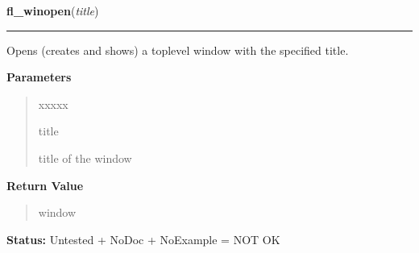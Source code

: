 \hspace{.8\funcindent}\begin{boxedminipage}{\funcwidth}

    \raggedright \textbf{fl\_winopen}(\textit{title})

    \vspace{-1.5ex}

    \rule{\textwidth}{0.5\fboxrule}
\setlength{\parskip}{2ex}
    Opens (creates and shows) a toplevel window with the specified title.

\setlength{\parskip}{1ex}
      \textbf{Parameters}
      \vspace{-1ex}

      \begin{quote}
        \begin{Ventry}{xxxxx}

          \item[title]

          title of the window

        \end{Ventry}

      \end{quote}

      \textbf{Return Value}
    \vspace{-1ex}

      \begin{quote}
      window

      \end{quote}

\textbf{Status:} Untested + NoDoc + NoExample = NOT OK



    \end{boxedminipage}

    \label{xformslib:library:fl_winhide}

    \vspace{0.5ex}

